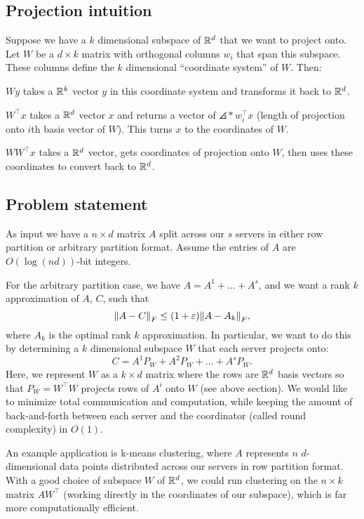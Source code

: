 \documentclass{article}
\begin{document}
\subsection{Projection intuition}
Suppose we have a $k$ dimensional subspace of $\mathbb{R}^d $ that we want to project onto. Let $W$ be a $d \times k$ matrix with orthogonal columns $w_i $ that span this subspace. These columns define the $k$ dimensional ``coordinate system'' of $W$. Then:
\begin{enum}
    \item $Wy$ takes a $\mathbb{R}^k $ vector $y$ in this coordinate system and transforms it back to $\mathbb{R}^d $. 
    \item $W^{\top} x$ takes a $\mathbb{R}^d $ vector $x$ and returns a vector of $\angles*{w_i ^{\top} x} $ (length of projection onto $i$th basis vector of $W$). This turns $x$ to the coordinates of $W$. 
    \item $WW^{\top}x$ takes a $\mathbb{R}^d $ vector, gets coordinates of projection onto $W$, then uses these coordinates to convert back to $\mathbb{R}^d $. 
\end{enum}

\subsection{Problem statement}

As input we have a $n\times d$ matrix $A$ split across our $s$ servers in either row partition or arbitrary partition format. Assume the entries of $A$ are $O(\log (nd))$-bit integers. 

For the arbitrary partition case, we have $A = A^1  +\dots +A^s $, and we want a rank $k$ approximation of $A$, $C$, such that 
\[
    \norm*{A - C}_{F} \leq (1+\eps )\norm*{A - A_k }_{F} ,
\]
where $A_k $ is the optimal rank $k$ approximation. In particular, we want to do this by determining a $k$ dimensional subspace $W$ that each server projects onto:
\[
    C = A^1 P_W  + A^2 P_W +\dots +A^s P_W . 
\]
Here, we represent $W$ as a $k\times d$ matrix where the rows are $\mathbb{R}^d $ basis vectors so that $P_W = W^{\top} W$ projects rows of $A^i $ onto $W$ (see above section). We would like to minimize total communication and computation, while keeping the amount of back-and-forth between each server and the coordinator (called round complexity) in $O(1)$. 

An example application is k-means clustering, where $A$ represents $n$ $d$-dimensional data points distributed across our servers in row partition format. With a good choice of subspace $W$ of $\mathbb{R}^d $, we could run clustering on the $n \times k$ matrix $AW^{\top} $ (working directly in the coordinates of our subspace), which is far more computationally efficient. 
\end{document}
